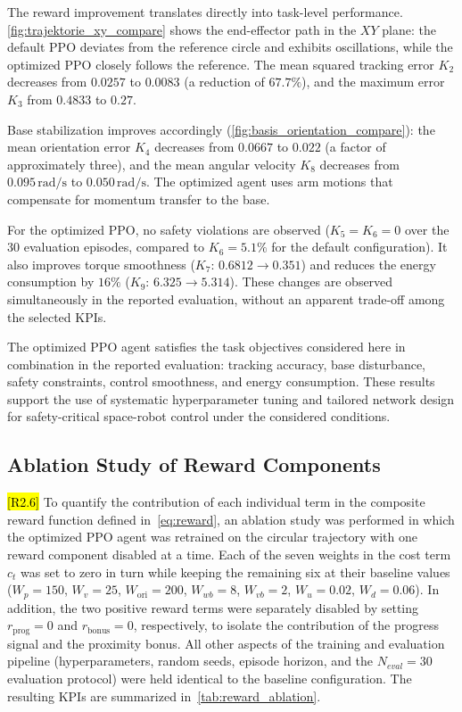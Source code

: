 \documentclass{ieeeaccess}
\newcommand{\hltwo}[1]{{\sethlcolor{rtwo}\hl{#1}}}
\newenvironment{rtwohl}
  {\def\FrameCommand{\colorbox{rtwo}}\MakeFramed{\advance\hsize-\width\FrameRestore}}
  {\endMakeFramed}
\begin{document}
The reward improvement translates directly into task-level performance. \autoref{fig:trajektorie_xy_compare}
shows the end-effector path in the $XY$ plane: the default PPO deviates from the reference circle and exhibits oscillations, while the optimized PPO closely follows the reference. The mean squared tracking error $K_2$ decreases from $0.0257$ to $0.0083$ (a reduction of $67.7\%$), and the maximum error $K_3$ from $0.4833$ to $0.27$.

Base stabilization improves accordingly (\autoref{fig:basis_orientation_compare}): the mean orientation error $K_4$ decreases from $0.0667$ to $0.022$ (a factor of approximately three), and the mean angular velocity $K_8$ decreases from $0.095\,\mathrm{rad/s}$ to $0.050\,\mathrm{rad/s}$. The optimized agent uses arm motions that compensate for momentum transfer to the base.

For the optimized PPO, no safety violations are observed ($K_5 = K_6 = 0$ over the 30 evaluation episodes, compared to $K_6 = 5.1\%$ for the default configuration). It also improves torque smoothness ($K_7$: $0.6812 \to 0.351$) and reduces the energy consumption by $16\%$ ($K_9$: $6.325 \to 5.314$). These changes are observed simultaneously in the reported evaluation, without an apparent trade-off among the selected KPIs.

The optimized PPO agent satisfies the task objectives considered here in combination in the reported evaluation: tracking accuracy, base disturbance, safety constraints, control smoothness, and energy consumption. These results support the use of systematic hyperparameter tuning and tailored network design for safety-critical space-robot control under the considered conditions.

\subsection{Ablation Study of Reward Components}\label{sec:reward_ablation}
\begin{rtwohl}
\hltwo{[R2.6]} To quantify the contribution of each individual term in the composite reward function defined in~\autoref{eq:reward},
an ablation study was performed in which the optimized PPO agent was retrained on the circular trajectory with one reward component
disabled at a time. Each of the seven weights in the cost term $c_t$ was set to zero in turn while keeping the remaining six at
their baseline values ($W_p=150$, $W_v=25$, $W_{\mathrm{ori}}=200$, $W_{wb}=8$, $W_{vb}=2$, $W_u=0.02$, $W_d=0.06$). In addition,
the two positive reward terms were separately disabled by setting $r_{\text{prog}}=0$ and $r_{\text{bonus}}=0$, respectively,
to isolate the contribution of the progress signal and the proximity bonus. All other aspects of the training and evaluation
pipeline (hyperparameters, random seeds, episode horizon, and the $N_{eval}=30$ evaluation protocol) were held identical to
the baseline configuration. The resulting KPIs are summarized in~\autoref{tab:reward_ablation}.
\end{rtwohl}
\end{document}
